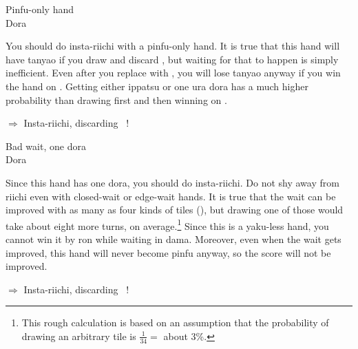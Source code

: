 \begin{itembox}[r]{{\jap Pinfu}-only hand}
\bp
{}~~\bei\\
\hfill\footnotesize{{\jap Dora}~~~~~~~}
\ep {}
\vspace{-15pt}
\end{itembox}

\noindent You should do insta-riichi with a {\jap pinfu}-only hand. It is true that this hand will have {\jap tanyao} if you draw {\LARGE {}} and discard {\LARGE {}}, but waiting for that to happen is simply inefficient. Even after you replace {\LARGE{}} with {\LARGE{}}, you will lose {\jap tanyao} anyway if you win the hand on {\LARGE{}}. Getting either {\jap ippatsu} or one {\jap ura dora} has a much higher probability than drawing {\LARGE {}} first and then winning on {\LARGE {}}. 

\begin{center}
{\Large $\Rightarrow$ Insta-riichi, discarding ~!}
\end{center}

\bigskip
\begin{itembox}[r]{Bad wait, one {\jap dora}}
\bp
{}\bei\bei\bei\xi~~\\
\hfill\footnotesize{{\jap Dora}~~~~~~~}
\ep
\vspace{-15pt}
\end{itembox}

\noindent Since this hand has one {\jap dora}, you should do insta-riichi. Do not shy away from riichi even with closed-wait or edge-wait hands. It is true that the wait can be improved with as many as four kinds of tiles ({\LARGE {}}), but drawing one of those would take about eight more turns, on average.\footnote{This rough calculation is based on an assumption that the probability of drawing an arbitrary tile is $\frac{1}{34}=$ about 3\%.} 
Since this is a {\jap yaku}-less hand, you cannot win it by {\jap ron} while waiting in {\jap dama}.  
Moreover, even when the wait gets improved, this hand will never become {\jap pinfu} anyway, so the score will not be improved. 

\begin{center}
{\Large $\Rightarrow$ Insta-riichi, discarding \xi ~!}
\end{center}

